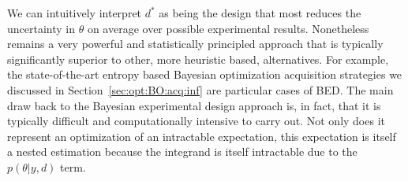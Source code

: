 We can intuitively interpret $d^*$ as being the design that most reduces the uncertainty in $\theta$
on average over possible experimental results.  Nonetheless \Bad remains a very powerful and
statistically principled approach that is typically significantly superior to other, more heuristic based,
alternatives.  For example, the state-of-the-art entropy based Bayesian optimization acquisition strategies we 
discussed in Section~\ref{sec:opt:BO:acq:inf} are particular cases of BED.
The main draw back to the Bayesian experimental design 
approach is, in fact, that it is typically difficult and computationally intensive to carry out.  
Not only does it represent an optimization 
of an intractable expectation, this expectation is itself a nested estimation because
the integrand is itself intractable due to the $p\left(\theta | y, d\right)$ term.
